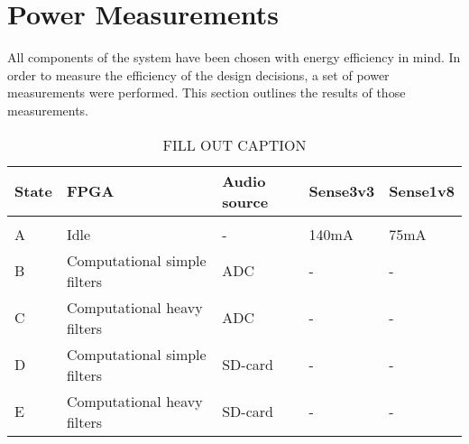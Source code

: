 \section{Power Measurements}\label{power_measurements}

All components of the
system have been chosen with energy efficiency in mind. In order to measure
the efficiency of the design decisions, a set of power measurements were
performed. This section outlines the results of those measurements.

\begin{table}[H]
    \begin{tabular}{lllll}
	State & FPGA                         & Audio source & Sense3v3 & Sense1v8 \\
	\hline \\
	A     & Idle                         & -            & 140mA    & 75mA \\
	B     & Computational simple filters & ADC          & -        & - \\
	C     & Computational heavy filters  & ADC          & -        & - \\
        D     & Computational simple filters & SD-card      & -        & - \\
        E     & Computational heavy filters  & SD-card      & -        & -
    \end{tabular}
    \label{tab:results/power-measurement}
    \caption{FILL OUT CAPTION}
\end{table}

